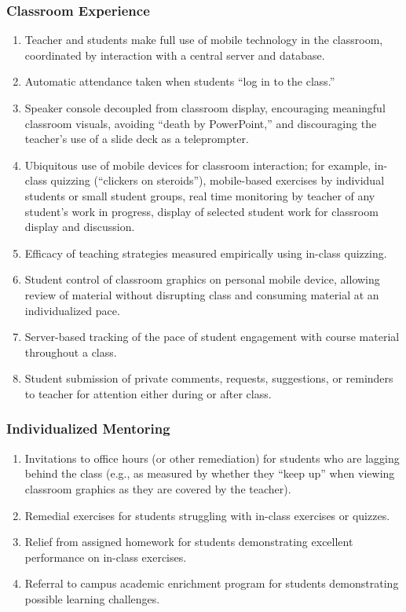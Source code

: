 \documentclass{article}
\begin{document}
\subsubsection{Classroom Experience}
\begin{enumerate}
\item Teacher and students make full use of mobile technology in the classroom,
  coordinated by interaction with a central server and database.
\item Automatic attendance taken when students ``log in to the class.''
\item Speaker console decoupled from classroom display,
  encouraging meaningful classroom visuals,
  avoiding ``death by PowerPoint,'' and
  discouraging the teacher's use of a slide deck as a teleprompter.
\item Ubiquitous use of mobile devices for classroom interaction; for example,
  in-class quizzing (``clickers on steroids''),
  mobile-based exercises by individual students or small student groups,
  real time monitoring by teacher of any student's work in progress,
  display of selected student work for classroom display and discussion.
\item Efficacy of teaching strategies measured empirically using in-class quizzing.
\item Student control of classroom graphics on personal mobile device,
  allowing review of material without disrupting class and
  consuming material at an individualized pace.
\item Server-based tracking of the pace of student engagement with course material
  throughout a class.
\item Student submission of private comments, requests, suggestions, or reminders to
  teacher for attention either during or after class.
\end{enumerate}

\subsubsection{Individualized Mentoring}
\begin{enumerate}
\item Invitations to office hours (or other remediation) for students who are lagging
  behind the class (e.g., as measured by whether they ``keep up'' when viewing classroom
  graphics as they are covered by the teacher).
\item Remedial exercises for students struggling with in-class exercises or quizzes.
\item Relief from assigned homework for students demonstrating excellent performance on
  in-class exercises.
\item Referral to campus academic enrichment program for students demonstrating possible
  learning challenges.
\end{enumerate}
\end{document}
